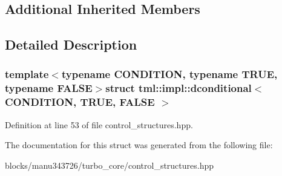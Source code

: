 \subsection*{Additional Inherited Members}


\subsection{Detailed Description}
\subsubsection*{template$<$typename C\+O\+N\+D\+I\+T\+I\+O\+N, typename T\+R\+U\+E, typename F\+A\+L\+S\+E$>$struct tml\+::impl\+::dconditional$<$ C\+O\+N\+D\+I\+T\+I\+O\+N, T\+R\+U\+E, F\+A\+L\+S\+E $>$}



Definition at line 53 of file control\+\_\+structures.\+hpp.



The documentation for this struct was generated from the following file\+:\begin{DoxyCompactItemize}
\item 
blocks/manu343726/turbo\+\_\+core/control\+\_\+structures.\+hpp\end{DoxyCompactItemize}
